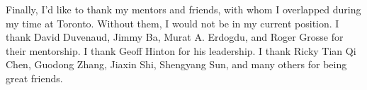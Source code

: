 Finally, I'd like to thank my mentors and friends, with whom I overlapped during my time at Toronto. 
Without them, I would not be in my current position.
I thank David Duvenaud, Jimmy Ba, Murat A. Erdogdu, and Roger Grosse for their mentorship. 
I thank Geoff Hinton for his leadership.
I thank Ricky Tian Qi Chen, Guodong Zhang, Jiaxin Shi, Shengyang Sun, and many others for being great friends.
